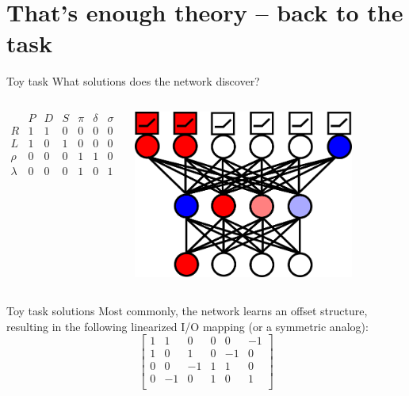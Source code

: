 \documentclass{beamer}
\begin{document}
\section{That's enough theory -- back to the task}
\begin{frame}{Toy task}
What solutions does the network discover?
\begin{columns}
	    \[
	    \begin{array}{c|cccccc} 
	    & P & D & S & \pi & \delta & \sigma \\
	    \hline
	    R & 1 & 1 & 0 & 0 & 0 & 0 \\
	    L & 1 & 0 & 1 & 0 & 0 & 0 \\
	    \rho & 0 & 0 & 0 & 1 & 1 & 0\\
	    \lambda & 0 & 0 & 0 & 1 & 0 & 1\\
	    \end{array} 
	    \]
	\begin{center}
	    \includegraphics[width=0.8\textwidth]{../writing/cogsci_2017/figures/network_diagram.png}
	\end{center}
\end{columns}
\end{frame}

\begin{frame}{Toy task solutions}
Most commonly, the network learns an offset structure, resulting in the following linearized I/O mapping (or a symmetric analog): 
\[
\left[ \begin{matrix} 
1 & 1 & 0 & 0 & 0 & -1 \\
1 & 0 & 1 & 0 & -1 & 0 \\
 0 & 0 & -1 & 1 & 1 & 0\\
 0 & -1 & 0 & 1 & 0 & 1\\
\end{matrix}  \right] 
\]
\end{frame}
\end{document}

